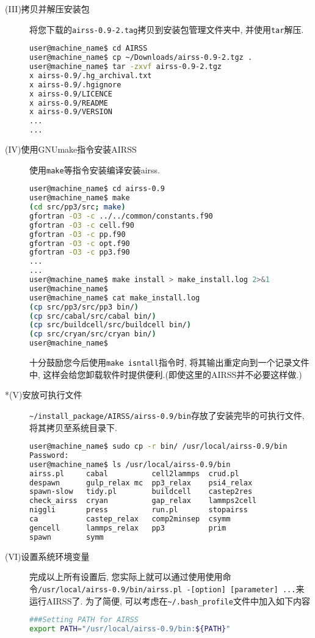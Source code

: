 \documentclass[a4paper, 10pt]{article}
\begin{document}
\begin{description}
          \item [(III)拷贝并解压安装包] 将您下载的\verb|airss-0.9-2.tag|拷贝到安装包管理文件夹中, 并使用\verb|tar|解压.
          \begin{lstlisting}[language={bash}]
user@machine_name$ cd AIRSS
user@machine_name$ cp ~/Downloads/airss-0.9-2.tgz .
user@machine_name$ tar -zxvf airss-0.9-2.tgz
x airss-0.9/.hg_archival.txt
x airss-0.9/.hgignore
x airss-0.9/LICENCE
x airss-0.9/README
x airss-0.9/VERSION 
...
...
          \end{lstlisting}

          \item[(IV)使用GNUmake指令安装AIRSS] 使用\verb|make|等指令安装编译安装airss.
          \begin{lstlisting}[language={bash}]
user@machine_name$ cd airss-0.9
user@machine_name$ make
(cd src/pp3/src; make)
gfortran -O3 -c ../../common/constants.f90
gfortran -O3 -c cell.f90
gfortran -O3 -c pp.f90
gfortran -O3 -c opt.f90
gfortran -O3 -c pp3.f90
...
...
user@machine_name$ make install > make_install.log 2>&1
user@machine_name$
user@machine_name$ cat make_install.log
(cp src/pp3/src/pp3 bin/)
(cp src/cabal/src/cabal bin/)
(cp src/buildcell/src/buildcell bin/)
(cp src/cryan/src/cryan bin/)
user@machine_name$
          \end{lstlisting}
          
          十分鼓励您今后使用\verb|make isntall|指令时, 将其输出重定向到一个记录文件中, 这样会给您卸载软件时提供便利.(即使这里的AIRSS并不必要这样做.)

        \item[*(V)安放可执行文件] \verb|~/install_package/AIRSS/airss-0.9/bin|存放了安装完毕的可执行文件, 将其拷贝至系统目录下.
        \begin{lstlisting}[language={bash}]
user@machine_name$ sudo cp -r bin/ /usr/local/airss-0.9/bin
Password:
user@machine_name$ ls /usr/local/airss-0.9/bin
airss.pl     cabal          cell2lammps  crud.pl      
despawn      gulp_relax mc  pp3_relax    psi4_relax   
spawn-slow   tidy.pl        buildcell    castep2res   
check_airss  cryan          gap_relax    lammps2cell  
niggli       press          run.pl       stopairss    
ca           castep_relax   comp2minsep  csymm        
gencell      lammps_relax   pp3          prim         
spawn        symm

        \end{lstlisting}

        \item[(VI)设置系统环境变量] 完成以上所有设置后, 您实际上就可以通过使用使用命令\verb|/usr/local/airss-0.9/bin/airss.pl -[option] [parameter] ...|来运行AIRSS了. 为了简便, 可以考虑在\verb|~/.bash_profile|文件中加入如下内容
        \begin{lstlisting}[language={bash}]
###Setting PATH for AIRSS
export PATH="/usr/local/airss-0.9/bin:${PATH}"
        \end{lstlisting}


\end{description}
\end{document}
